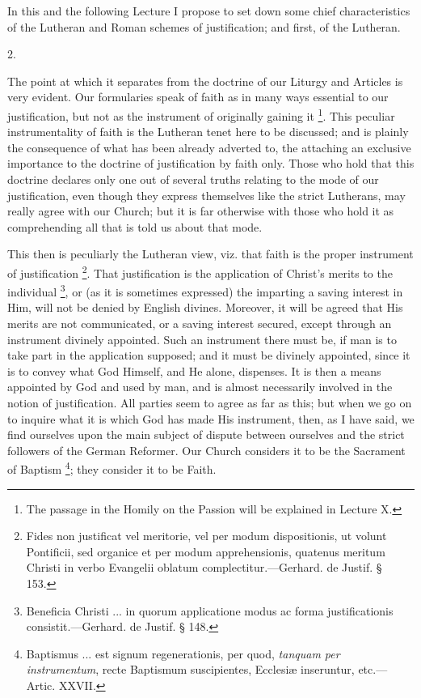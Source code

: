 In this and the following Lecture I propose to set down some chief
characteristics of the Lutheran and Roman schemes of justification;
and first, of the Lutheran.

2.

The point at which it separates from the doctrine of our Liturgy
and Articles is very evident. Our formularies speak of faith as in
many ways essential to our justification, but not as the instrument of
originally gaining it \footnote{The passage in
the Homily on the Passion will be explained in Lecture
X.}. This peculiar instrumentality of faith
is the Lutheran tenet here to be discussed; and is plainly the
consequence of what has been already adverted to, the attaching an
exclusive importance to the doctrine of justification by faith only.
Those who hold that this doctrine declares only one out of several
truths relating to the mode of our justification, even though they
express themselves like the strict Lutherans, may really agree with
our Church; but it is far otherwise with those who hold it as
comprehending all that is told us about that mode.

This then is peculiarly the Lutheran view, viz. that faith is the
proper instrument of justification \footnote{Fides non
justificat vel meritorie, vel per modum dispositionis, ut volunt
Pontificii, sed organice et per modum apprehensionis, quatenus meritum
Christi in verbo Evangelii oblatum complectitur.—Gerhard. de Justif.
§ 153.}. That justification is the
application of Christ's merits to the individual \footnote{Beneficia
Christi ... in quorum applicatione modus ac forma justificationis
consistit.—Gerhard. de Justif. § 148.}, or (as it
is sometimes expressed) the imparting a saving interest in Him, will
not be denied by English divines. Moreover, it will be agreed that His
merits are not communicated, or a saving interest secured, except
through an instrument divinely appointed. Such an instrument there
must be, if man is to take part in the application supposed; and it
must be divinely appointed, since it is to convey what God Himself,
and He alone, dispenses. It is then a means appointed by God and
used by man, and is almost necessarily involved in the notion of
justification. All parties seem to agree as far as this; but when we
go on to inquire what it is which God has made His instrument, then,
as I have said, we find ourselves upon the main subject of dispute
between ourselves and the strict followers of the German Reformer. Our
Church considers it to be the Sacrament of Baptism \footnote{Baptismus ...
est signum regenerationis, per quod, \emph{tanquam per instrumentum},
recte Baptismum suscipientes, Ecclesiæ inseruntur, etc.—Artic.
XXVII.}; they
consider it to be Faith.

